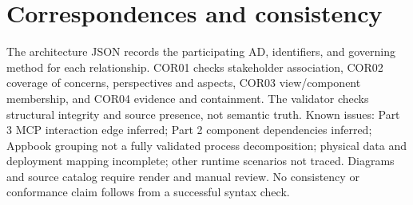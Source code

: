 \documentclass[10pt,letterpaper]{article}
\begin{document}
\section{Correspondences and consistency}
The architecture JSON records the participating AD, identifiers, and governing method for each relationship. COR01 checks stakeholder association, COR02 coverage of concerns, perspectives and aspects, COR03 view/component membership, and COR04 evidence and containment. The validator checks structural integrity and source presence, not semantic truth. Known issues: Part 3 MCP interaction edge inferred; Part 2 component dependencies inferred; Appbook grouping not a fully validated process decomposition; physical data and deployment mapping incomplete; other runtime scenarios not traced. Diagrams and source catalog require render and manual review. No consistency or conformance claim follows from a successful syntax check.
\end{document}
